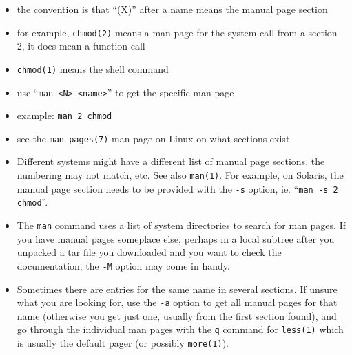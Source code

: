 
\begin{slide}
\begin{itemize}
\item the convention is that ``(X)'' after a name means the manual page section
\item for example, \texttt{chmod(2)} means a man page for the system call from a
section 2, it does  mean a function call
\item \texttt{chmod(1)} means the shell command
\item use ``\texttt{man <N> <name>}'' to get the specific man page
\item example: \texttt{man 2 chmod}
\item see the \texttt{man-pages(7)} man page on Linux on what sections exist
\end{itemize}
\end{slide}

\begin{itemize}
\item Different systems might have a different list of manual page sections, the
numbering may not match, etc.  See also \texttt{man(1)}.  For example, on
Solaris, the manual page section needs to be provided with the \texttt{-s}
option, ie. ``\texttt{man -s 2 chmod}''.
\item The \texttt{man} command uses a list of system directories to search for
man pages.  If you have manual pages someplace else, perhaps in a local subtree
after you unpacked a tar file you downloaded and you want to check the
documentation, the \texttt{-M} option may come in handy.
\item Sometimes there are entries for the same name in several sections.  If
unsure what you are looking for, use the \texttt{-a} option to get all manual
pages for that name (otherwise you get just one, usually from the first
section found), and go through the individual man pages with the \texttt{q}
command for \texttt{less(1)} which is usually the default pager (or possibly
\texttt{more(1)}).
\end{itemize}

\label{C_LANGUAGE}

